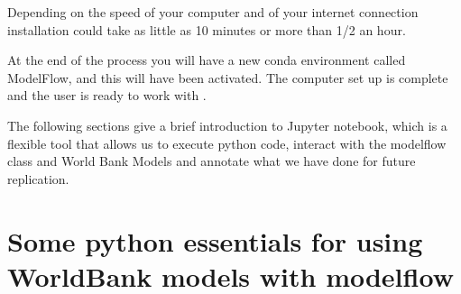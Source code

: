 \documentclass[letterpaper,10pt,english]{jupyterBook}
\begin{document}
\begin{sphinxVerbatim}[commandchars=\\\{\}]
          
  
  
     
    
   
   
   

\end{sphinxVerbatim}

\sphinxAtStartPar
Depending on the speed of your computer and of your internet connection installation could take as little as 10 minutes or more than 1/2 an hour.

\sphinxAtStartPar
At the end of the process you will have a new conda environment called ModelFlow, and this will have been activated. The computer set up is complete and the user is ready to work with .

\sphinxAtStartPar
The following sections give a brief introduction to Jupyter notebook, which is a flexible tool that allows us to execute python code, interact with the modelflow class and World Bank Models and annotate what we have done for future replication.

\sphinxstepscope


\part{Some python essentials for using WorldBank models with modelflow}

\sphinxstepscope
\end{document}
